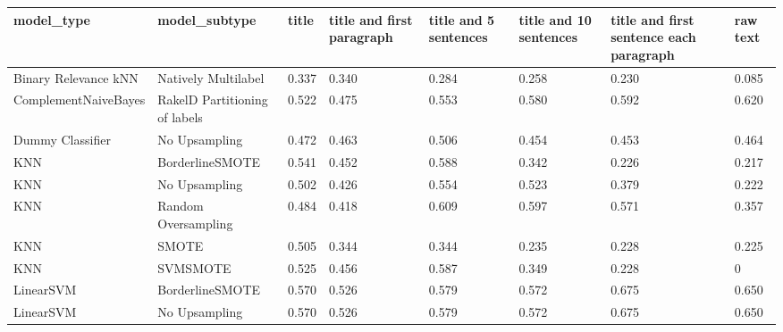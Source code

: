 \begin{tabular}{llllllll}
\toprule
                     model\_type &                 model\_subtype & title & title and first paragraph & title and 5 sentences & title and 10 sentences & title and first sentence each paragraph &  raw text \\
\midrule
           Binary Relevance kNN &           Natively Multilabel & 0.337 &                     0.340 &                 0.284 &                  0.258 &                                   0.230 &     0.085 \\
           ComplementNaiveBayes & RakelD Partitioning of labels & 0.522 &                     0.475 &                 0.553 &                  0.580 &                                   0.592 &     0.620 \\
               Dummy Classifier &                 No Upsampling & 0.472 &                     0.463 &                 0.506 &                  0.454 &                                   0.453 &     0.464 \\
                            KNN &               BorderlineSMOTE & 0.541 &                     0.452 &                 0.588 &                  0.342 &                                   0.226 &     0.217 \\
                            KNN &                 No Upsampling & 0.502 &                     0.426 &                 0.554 &                  0.523 &                                   0.379 &     0.222 \\
                            KNN &           Random Oversampling & 0.484 &                     0.418 &                 0.609 &                  0.597 &                                   0.571 &     0.357 \\
                            KNN &                         SMOTE & 0.505 &                     0.344 &                 0.344 &                  0.235 &                                   0.228 &     0.225 \\
                            KNN &                      SVMSMOTE & 0.525 &                     0.456 &                 0.587 &                  0.349 &                                   0.228 &         0 \\
                      LinearSVM &               BorderlineSMOTE & 0.570 &                     0.526 &                 0.579 &                  0.572 &                                   0.675 &     0.650 \\
                      LinearSVM &                 No Upsampling & 0.570 &                     0.526 &                 0.579 &                  0.572 &                                   0.675 &     0.650 \\

\end{tabular}
